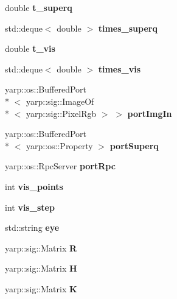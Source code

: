\begin{DoxyCompactItemize}
\item 
double {\bfseries t\-\_\-superq}\label{classSuperqModule_a981bafe724d09df7beb3c10fa96a8980}

\item 
std\-::deque$<$ double $>$ {\bfseries times\-\_\-superq}\label{classSuperqModule_a28517e736a16c5e7dfde3bcbec6bf5fd}

\item 
double {\bfseries t\-\_\-vis}\label{classSuperqModule_ac4b02568e69c9ed84739bb252a31def6}

\item 
std\-::deque$<$ double $>$ {\bfseries times\-\_\-vis}\label{classSuperqModule_af8194f823d1dfc5072988680d71aab08}

\item 
yarp\-::os\-::\-Buffered\-Port\\*
$<$ yarp\-::sig\-::\-Image\-Of\\*
$<$ yarp\-::sig\-::\-Pixel\-Rgb $>$ $>$ {\bfseries port\-Img\-In}\label{classSuperqModule_aff224bd8fb7b12d73b2060b38f7a8718}

\item 
yarp\-::os\-::\-Buffered\-Port\\*
$<$ yarp\-::os\-::\-Property $>$ {\bfseries port\-Superq}\label{classSuperqModule_ac73ad3c50ea4fe58e35a722c37a7f99e}

\item 
yarp\-::os\-::\-Rpc\-Server {\bfseries port\-Rpc}\label{classSuperqModule_ab44a4843a8cb533d80d55df985b11448}

\item 
int {\bfseries vis\-\_\-points}\label{classSuperqModule_ae8e5d7e83ef5cd80a44ce6a3bcc74cd7}

\item 
int {\bfseries vis\-\_\-step}\label{classSuperqModule_a73aa4f6c8c4c9142fb5456c9cdaaf6b6}

\item 
std\-::string {\bfseries eye}\label{classSuperqModule_a016da49606647c049c4b857a32c633c6}

\item 
yarp\-::sig\-::\-Matrix {\bfseries R}\label{classSuperqModule_ab0570fcea5cbee6364f780cca614164d}

\item 
yarp\-::sig\-::\-Matrix {\bfseries H}\label{classSuperqModule_acf23ebc65162db020fd4e25ca73ea165}

\item 
yarp\-::sig\-::\-Matrix {\bfseries K}\label{classSuperqModule_ac6ee7467d82e835c0d1b2e35236e4aaf}


\end{DoxyCompactItemize}
